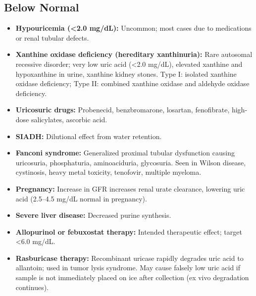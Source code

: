 \subsection*{Below Normal}
\begin{itemize}
  \item \textbf{Hypouricemia (<2.0 mg/dL):} Uncommon; most cases due to medications or renal tubular defects.
  \item \textbf{Xanthine oxidase deficiency (hereditary xanthinuria):} Rare autosomal recessive disorder; very low uric acid (<2.0 mg/dL), elevated xanthine and hypoxanthine in urine, xanthine kidney stones. Type I: isolated xanthine oxidase deficiency; Type II: combined xanthine oxidase and aldehyde oxidase deficiency.
  \item \textbf{Uricosuric drugs:} Probenecid, benzbromarone, losartan, fenofibrate, high-dose salicylates, ascorbic acid.
  \item \textbf{SIADH:} Dilutional effect from water retention.
  \item \textbf{Fanconi syndrome:} Generalized proximal tubular dysfunction causing uricosuria, phosphaturia, aminoaciduria, glycosuria. Seen in Wilson disease, cystinosis, heavy metal toxicity, tenofovir, multiple myeloma.
  \item \textbf{Pregnancy:} Increase in GFR increases renal urate clearance, lowering uric acid (2.5--4.5 mg/dL normal in pregnancy).
  \item \textbf{Severe liver disease:} Decreased purine synthesis.
  \item \textbf{Allopurinol or febuxostat therapy:} Intended therapeutic effect; target <6.0 mg/dL.
  \item \textbf{Rasburicase therapy:} Recombinant uricase rapidly degrades uric acid to allantoin; used in tumor lysis syndrome. May cause falsely low uric acid if sample is not immediately placed on ice after collection (ex vivo degradation continues).
\end{itemize}

